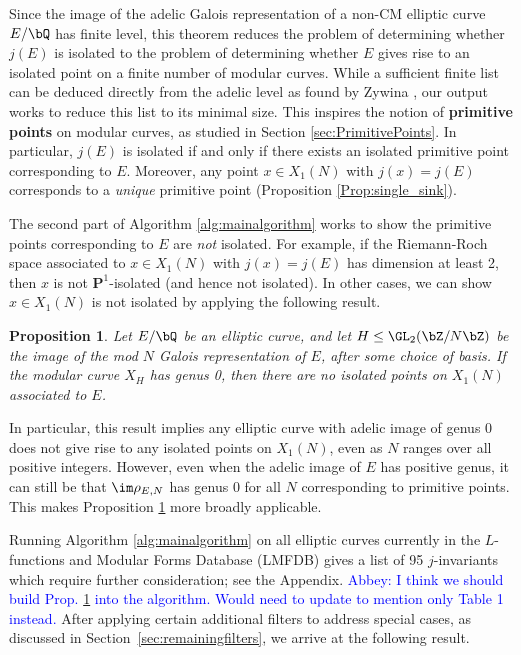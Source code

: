 \documentclass[11pt,reqno]{amsart}
\theoremstyle{plain}
\newtheorem{proposition}[theorem]{Proposition}
\theoremstyle{definition}
\newcommand{\Q}{\bQ}
\newcommand{\Z}{\bZ}
\newcommand{\PP}{\mathbf P}
\newcommand{\abbey}[1]{\textcolor{blue}{Abbey: #1}}
\begin{document}
\noindent Since the image of the adelic Galois representation of a non-CM elliptic curve $E/\Q$ has finite level, this theorem reduces the problem of determining whether $j(E)$ is isolated to the problem of determining whether $E$ gives rise to an isolated point on a finite number of modular curves. While a sufficient finite list can be deduced directly from the adelic level as found by Zywina \cite{ZywinaAlgorithm}, our output works to reduce this list to its minimal size. This inspires the notion of \textbf{primitive points} on modular curves, as studied in Section \ref{sec:PrimitivePoints}. In particular, $j(E)$ is isolated if and only if there exists an isolated primitive point corresponding to $E$. Moreover, any point $x\in X_1(N)$ with $j(x)=j(E)$ corresponds to a \emph{unique} primitive point (Proposition \ref{Prop:single_sink}).

The second part of Algorithm \ref{alg:mainalgorithm} works to show the primitive points corresponding to $E$ are \emph{not} isolated. For example, if the Riemann-Roch space associated to $x \in X_1(N)$ with $j(x)=j(E)$ has dimension at least 2, then $x$ is not $\PP^1$-isolated (and hence not isolated). In other cases, we can show $x \in X_1(N)$ is not isolated by applying the following result.

\begin{proposition} \label{Prop:Genus0Intro}
Let $E/\Q$ be an elliptic curve, and let $H \leq \GL_2(\Z/N\Z)$ be the image of the mod $N$ Galois representation of $E$, after some choice of basis. If the modular curve $X_H$ has genus 0, then there are no isolated points on $X_1(N)$ associated to $E$.
\end{proposition}

\noindent In particular, this result implies any elliptic curve with adelic image of genus 0 does not give rise to any isolated points on $X_1(N)$, even as $N$ ranges over all positive integers. However, even when the adelic image of $E$ has positive genus, it can still be that $\im \rho_{E,N}$ has genus 0 for all $N$ corresponding to primitive points. This makes Proposition \ref{Prop:Genus0Intro} more broadly applicable.

Running Algorithm \ref{alg:mainalgorithm} on all elliptic curves currently in the $L$-functions and Modular Forms Database (LMFDB) \cite{LMFDB} gives a list of 95 $j$-invariants which require further consideration; see the Appendix. \abbey{I think we should build Prop. \ref{Prop:Genus0Intro} into the algorithm. Would need to update to mention only Table 1 instead.} After applying certain additional filters to address special cases, as discussed in Section~\ref{sec:remainingfilters}, we arrive at the following result.
\end{document}
